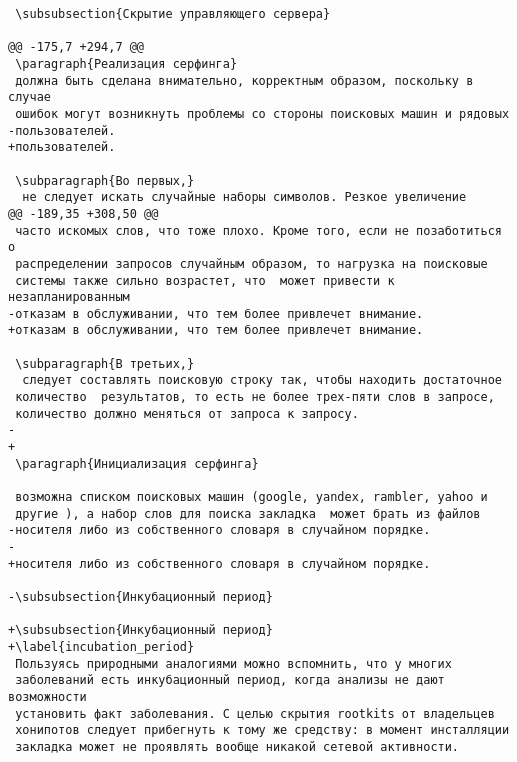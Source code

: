 \begin{verbatim}
 \subsubsection{Скрытие управляющего сервера}

@@ -175,7 +294,7 @@
 \paragraph{Реализация серфинга}
 должна быть сделана внимательно, корректным образом, поскольку в случае
 ошибок могут возникнуть проблемы со стороны поисковых машин и рядовых
-пользователей.
+пользователей.

 \subparagraph{Во первых,}
  не следует искать случайные наборы символов. Резкое увеличение
@@ -189,35 +308,50 @@
 часто искомых слов, что тоже плохо. Кроме того, если не позаботиться  о
 распределении запросов случайным образом, то нагрузка на поисковые
 системы также сильно возрастет, что  может привести к незапланированным
-отказам в обслуживании, что тем более привлечет внимание.
+отказам в обслуживании, что тем более привлечет внимание.

 \subparagraph{В третьих,}
  следует составлять поисковую строку так, чтобы находить достаточное
 количество  результатов, то есть не более трех-пяти слов в запросе,
 количество должно меняться от запроса к запросу.
-
+
 \paragraph{Инициализация серфинга}

 возможна списком поисковых машин (google, yandex, rambler, yahoo и
 другие ), а набор слов для поиска закладка  может брать из файлов
-носителя либо из собственного словаря в случайном порядке.
-
+носителя либо из собственного словаря в случайном порядке.

-\subsubsection{Инкубационный период}

+\subsubsection{Инкубационный период}
+\label{incubation_period}
 Пользуясь природными аналогиями можно вспомнить, что у многих
 заболеваний есть инкубационный период, когда анализы не дают возможности
 установить факт заболевания. С целью скрытия rootkits от владельцев
 хонипотов следует прибегнуть к тому же средству: в момент инсталляции
 закладка может не проявлять вообще никакой сетевой активности.


\end{verbatim}
